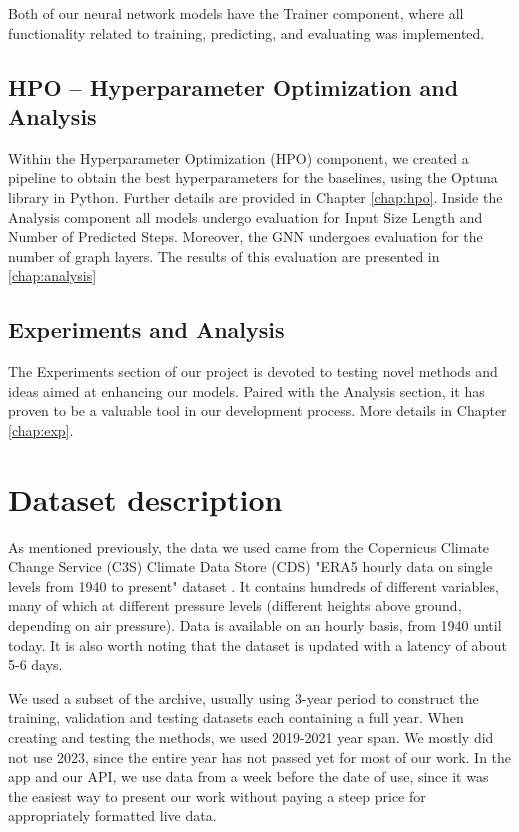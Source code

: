 Both of our neural network models have the Trainer component, where all functionality related to training, predicting, and evaluating was implemented.

\subsection{HPO -- Hyperparameter Optimization and Analysis}

Within the Hyperparameter Optimization (HPO) component, we created a pipeline to obtain the best hyperparameters for the baselines, using the Optuna library in Python. Further details are provided in Chapter \ref{chap:hpo}.
Inside the Analysis component all models undergo evaluation for Input Size Length and Number of Predicted Steps. Moreover, the GNN undergoes evaluation for the number of graph layers. The results of this evaluation are presented in \ref{chap:analysis}

\subsection{Experiments and Analysis}

The Experiments section of our project is devoted to testing novel methods and ideas aimed at enhancing our models. Paired with the Analysis section, it has proven to be a valuable tool in our development process. More details in Chapter \ref{chap:exp}.

\section{Dataset description}\label{chap:dataset}
As mentioned previously, the data we used came from the Copernicus Climate Change Service (C3S) Climate Data Store (CDS) "ERA5 hourly data on single levels from 1940 to present" dataset \cite{ERA5}. It contains hundreds of different variables, many of which at different pressure levels (different heights above ground, depending on air pressure). Data is available on an hourly basis, from 1940 until today. It is also worth noting that the dataset is updated with a latency of about 5-6 days.

We used a subset of the archive, usually using 3-year period to construct the training, validation and testing datasets each containing a full year. When creating and testing the methods, we used 2019-2021 year span. We mostly did not use 2023, since the entire year has not passed yet for most of our work. In the app and our API, we use data from a week before the date of use, since it was the easiest way to present our work without paying a steep price for appropriately formatted live data.


